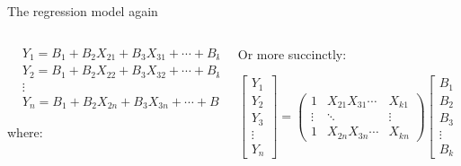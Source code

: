 \documentclass[australian,ignorenonframetext,aspectratio=169]{beamer}
\providecommand{\tightlist}{%
  \setlength{\itemsep}{0pt}\setlength{\parskip}{0pt}}
\begin{document}
\begin{frame}{The regression model again}
\protect\hypertarget{the-regression-model-again}{}

\begin{columns}[T]
\begin{column}{0.5\textwidth}
\tiny

\[\begin{aligned}
&Y_1=B_1+B_2 X_{21}+B_3 X_{31}+\cdots+B_k X_{k 1}+u_1 \\
&Y_2=B_1+B_2 X_{22}+B_3 X_{32}+\cdots+B_k X_{k 2}+u_2 \\
&\vdots \\
&Y_n=B_1+B_2 X_{2 n}+B_3 X_{3 n}+\cdots+B_k X_{k n}+u_n
\end{aligned}\]

where:

\end{column}

\begin{column}{0.5\textwidth}
\tiny

Or more succinctly:

\[
\left[\begin{array}{l}
Y_1 \\
Y_2 \\
Y_3 \\
\vdots \\
Y_n
\end{array}\right]=\left(\begin{array}{lll}
1 & X_{21} X_{31} \cdots & X_{k 1} \\
\vdots & \ddots & \vdots \\
1 & X_{2 n} X_{3 n} \cdots & X_{k n}
\end{array}\right)\left[\begin{array}{l}
B_1 \\
B_2 \\
B_3 \\
\vdots \\
B_k
\end{array}\right]+\left[\begin{array}{l}
u_1 \\
u_2 \\
\vdots \\
u_n
\end{array}\right]
\]
\end{column}
\end{columns}

\end{frame}
\end{document}
